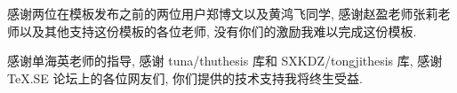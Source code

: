
\begin{acknowledgements}
  感谢两位在模板发布之前的两位用户郑博文以及黄鸿飞同学, 感谢赵盈老师张莉老师以及其他支持这份模板的各位老师, 没有你们的激励我难以完成这份模板.

  感谢单海英老师的指导, 感谢 tuna/thuthesis 库和 SXKDZ/tongjithesis 库, 感谢 TeX.SE 论坛上的各位网友们, 你们提供的技术支持我将终生受益.
\end{acknowledgements}
